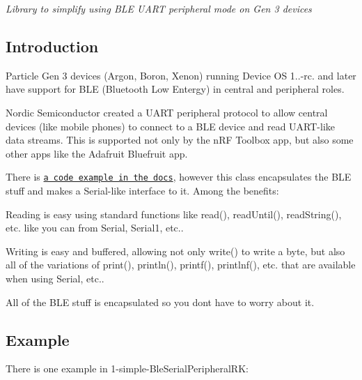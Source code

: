 {\itshape Library to simplify using B\+LE U\+A\+RT peripheral mode on Gen 3 devices}

\subsection*{Introduction}

Particle Gen 3 devices (Argon, Boron, Xenon) running Device OS 1..-\/rc. and later have support for B\+LE (Bluetooth Low Entergy) in central and peripheral roles.

Nordic Semiconductor created a U\+A\+RT peripheral protocol to allow central devices (like mobile phones) to connect to a B\+LE device and read U\+A\+R\+T-\/like data streams. This is supported not only by the n\+RF Toolbox app, but also some other apps like the Adafruit Bluefruit app.

There is \href{https://docs.particle.io/tutorials/device-os/bluetooth-le/#uart-peripheral}{\tt a code example in the docs}, however this class encapsulates the B\+LE stuff and makes a Serial-\/like interface to it. Among the benefits\+:


\begin{DoxyItemize}
\item Reading is easy using standard functions like read(), read\+Until(), read\+String(), etc. like you can from Serial, Serial1, etc..
\item Writing is easy and buffered, allowing not only write() to write a byte, but also all of the variations of print(), println(), printf(), printlnf(), etc. that are available when using Serial, etc..
\item All of the B\+LE stuff is encapsulated so you don\textquotesingle{}t have to worry about it.
\end{DoxyItemize}

\subsection*{Example}

There is one example in 1-\/simple-\/\+Ble\+Serial\+Peripheral\+RK\+:


